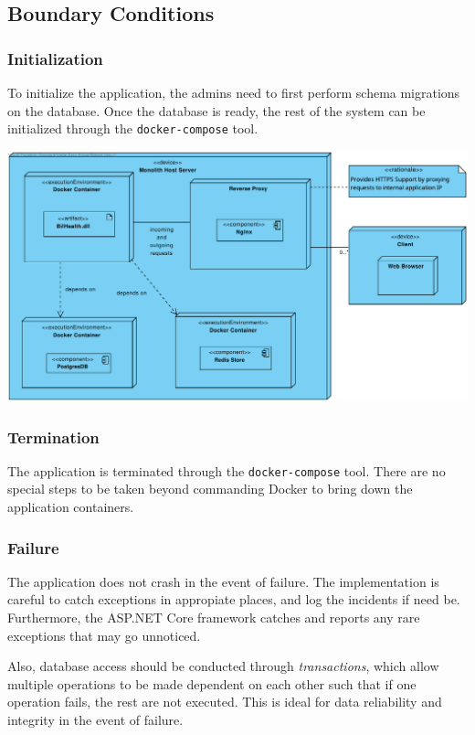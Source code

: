 \documentclass[a4paper, 12pt, titlepage]{article}
\begin{document}
  \pagebreak
  \subsection{Boundary Conditions}

  \subsubsection{Initialization}

  To initialize the application, the admins need to first perform schema migrations on the database.
  Once the database is ready, the rest of the system can be initialized through the \texttt{docker-compose} tool.

  \includegraphics[width=\linewidth]{deploy_diag.pdf}

  \subsubsection{Termination}

  The application is terminated through the \texttt{docker-compose} tool.
  There are no special steps to be taken beyond commanding Docker to bring down the application containers.

  \subsubsection{Failure}

  The application does not crash in the event of failure.
  The implementation is careful to catch exceptions in appropiate places, and log the incidents if need be.
  Furthermore, the ASP.NET Core framework catches and reports any rare exceptions that may go unnoticed.

  Also, database access should be conducted through \textit{transactions}, which allow multiple operations to
  be made dependent on each other such that if one operation fails, the rest are not executed.
  This is ideal for data reliability and integrity in the event of failure.
\end{document}

